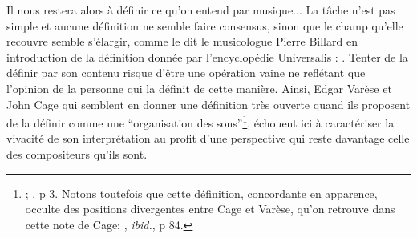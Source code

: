 \noindent Il nous restera alors à définir ce qu'on entend par musique... La tâche n'est pas simple et aucune définition ne semble faire consensus, sinon que le champ qu'elle recouvre semble s'élargir, comme le dit le musicologue Pierre Billard en introduction de la définition donnée par l'encyclopédie Universalis : . Tenter de la définir par son contenu risque d'être une opération vaine ne reflétant que l'opinion de la personne qui la définit de cette manière. Ainsi, Edgar Varèse et John Cage qui semblent en donner une définition très ouverte quand ils proposent de la définir comme une ``organisation des sons''\footnote{ \cite{varese_liberation_1966};  \cite{cage_silence:_1961}, p 3. Notons toutefois que cette définition, concordante en apparence, occulte des positions divergentes entre Cage et Varèse, qu'on retrouve dans cette note de Cage: , \textit{ibid.}, p 84.}, échouent ici à caractériser la vivacité de son interprétation au profit d'une perspective qui reste davantage celle des compositeurs qu'ils sont.\\
